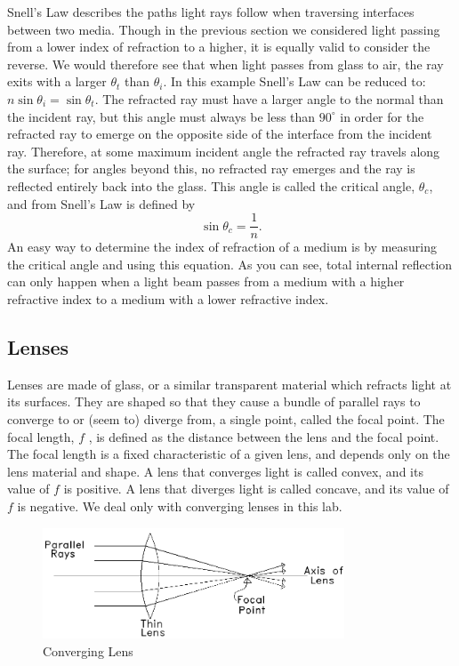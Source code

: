 Snell's Law describes the paths light rays follow when traversing interfaces between two media.  Though in the previous section we considered light passing from a lower index of refraction to a higher, it is equally valid to consider the reverse. We would therefore see that when light passes from glass to air, the ray exits with a larger $\theta_{t}$ than $\theta_{i}$.  In this example Snell's Law can be reduced to: $n \sin \theta_{i} = \sin \theta_{t}$.  The refracted ray must have a larger angle to the normal than the incident ray, but this angle must always be less than $90^\circ$ in order for the refracted ray to emerge on the opposite side of the interface from the incident ray.  Therefore, at some maximum incident angle the refracted ray travels along the surface; for angles beyond this, no refracted ray emerges and the ray is reflected entirely back into the glass. This angle is called the critical angle, $\theta_c$, and from Snell's Law is defined by
\begin{equation}
    \sin\theta_c = \frac{1}{n}.
\end{equation}
An easy way to determine the index of refraction of a medium is by measuring the critical angle and using this equation. As you can see, total internal reflection can only happen when a light beam passes from a medium with a higher refractive index to a medium with a lower refractive index. 

\subsection{Lenses}
\label{sec:lenses}
Lenses are made of glass, or a similar transparent material which refracts light at its surfaces. They are shaped so that they cause a bundle of parallel rays to converge to or (seem to) diverge from, a single point, called the focal point. The focal length, $f$ , is defined as the distance between the lens and the focal point. The focal length is a fixed characteristic of a given lens, and depends only on the lens material and shape. A lens that converges light is called convex, and its value of $f$ is positive. A lens that diverges light is called concave, and its value of $f$ is negative. We deal only with converging lenses in this lab.
\begin{figure}[h]
\centering
\includegraphics[width=0.8\textwidth]{./Exp6/pic/image1.png}
\caption{Converging Lens}
\end{figure} 

